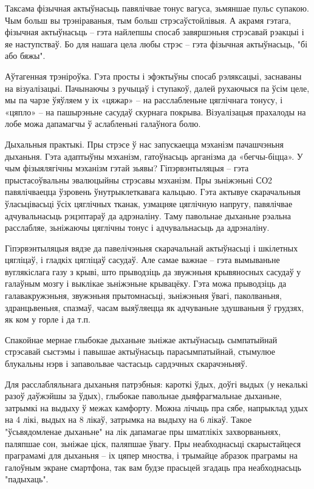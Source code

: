 Таксама фізычная актыўнасьць павялічвае тонус вагуса, зьмяншае пульс супакою. Чым больш вы трэніраваныя, тым больш стрэсаўстойлівыя. А акрамя гэтага, фізычная актыўнасьць – гэта найлепшы спосаб завяршэньня стрэсавай рэакцыі і яе наступстваў. Бо для нашага цела любы стрэс – гэта фізычная актыўнасьць, "бі або бяжы".

Аўтагенная трэніроўка. Гэта просты і эфэктыўны спосаб рэляксацыі, заснаваны на візуалізацыі. Пачынаючы з ручыцаў і ступакоў, далей рухаючыся па ўсім целе, мы па чарзе ўяўляем у іх «цяжар» – на расслабленьне цяглічнага тонусу, і «цяпло» – на пашырэньне сасудаў скурнага покрыва. Візуалізацыя прахалоды на лобе можа дапамагчы ў аслабленьні галаўнога болю.

Дыхальныя практыкі. Пры стрэсе ў нас запускаецца мэханізм пачашчэньня дыханьня. Гэта адаптыўны мэханізм, гатоўнасьць арганізма да «бегчы-біцца». У чым фізыялягічны мэханізм гэтай зьявы? Гіпэрвэнтыляцыя – гэта прыстасоўвальны эвалюцыйны стрэсавы мэханізм. Пры зьніжэньні СО2 павялічваецца ўзровень ўнутрыклеткавага кальцыю. Гэта актывуе скарачальныя ўласьцівасьці ўсіх цяглічных тканак, узмацняе цяглічную напругу, павялічвае адчувальнасьць рэцэптараў да адрэналіну. Таму павольнае дыханьне рэальна расслабляе, зьніжаючы цяглічны тонус і адчувальнасьць да адрэналіну.

Гіпэрвэнтыляцыя вядзе да павелічэньня скарачальнай актыўнасьці і шкілетных цягліцаў, і гладкіх цягліцаў сасудаў. Але самае важнае – гэта вымываньне вуглякіслага газу з крыві, што прыводзіць да звужэньня крывяносных сасудаў у галаўным мозгу і выклікае зьніжэньне крывацёку. Гэта можа прыводзіць да галавакружэньня, звужэньня прытомнасьці, зьніжэньня ўвагі, паколваньня, здранцьвеньня, спазмаў, часам выяўляецца як адчуваньне здушваньня ў грудзях, як ком у горле і да т.п. 

Спакойнае мернае глыбокае дыханьне зьніжае актыўнасьць сымпатыйнай стрэсавай сыстэмы і павышае актыўнасьць парасымпатыйнай, стымулюе блукальны нэрв і запавольвае частасьць сардэчных скарачэньняў.

Для расслабляльнага дыханьня патрэбныя: кароткі ўдых, доўгі выдых (у некалькі разоў даўжэйшы за ўдых), глыбокае павольнае дыяфрагмальнае дыханьне, затрымкі на выдыху ў межах камфорту. Можна лічыць пра сябе, напрыклад удых на 4 лікі, выдых на 8 лікаў, затрымка на выдыху на 6 лікаў. Такое "ўсьвядомленае дыханьне" на лік дапамагае пры шматлікіх захворваньнях, паляпшае сон, зьніжае ціск, паляпшае ўвагу. Пры неабходнасьці скарыстайцеся праграмамі для дыханьня – іх цяпер мноства, і трымайце абразок праграмы на галоўным экране смартфона, так вам будзе прасьцей згадаць пра неабходнасьць "падыхаць".

